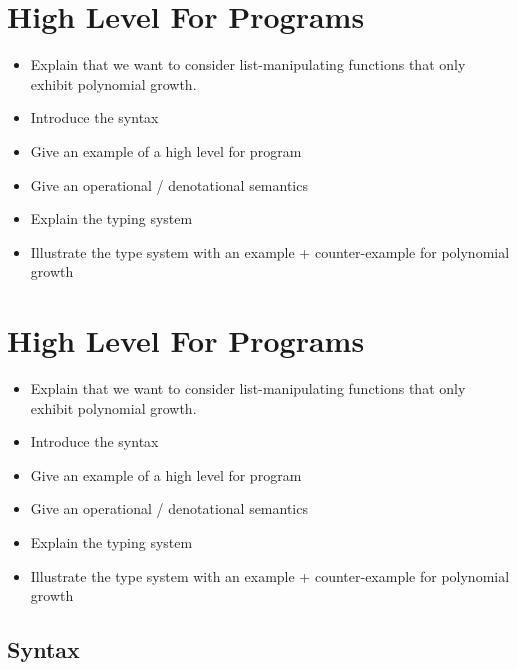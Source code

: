 \section{High Level For Programs}
\label{sec:high_level}

\begin{itemize}
    \item Explain that we want to consider list-manipulating functions
          that only exhibit polynomial growth.
    \item Introduce the syntax
    \item Give an example of a high level for program
    \item Give an operational / denotational semantics
    \item Explain the typing system
    \item Illustrate the type system with an example + counter-example for polynomial growth
\end{itemize}

\section{High Level For Programs}
\label{sec:high_level}

\begin{itemize}
    \item Explain that we want to consider list-manipulating functions
          that only exhibit polynomial growth.
    \item Introduce the syntax
    \item Give an example of a high level for program
    \item Give an operational / denotational semantics
    \item Explain the typing system
    \item Illustrate the type system with an example + counter-example for polynomial growth
\end{itemize}


\subsection{Syntax}



